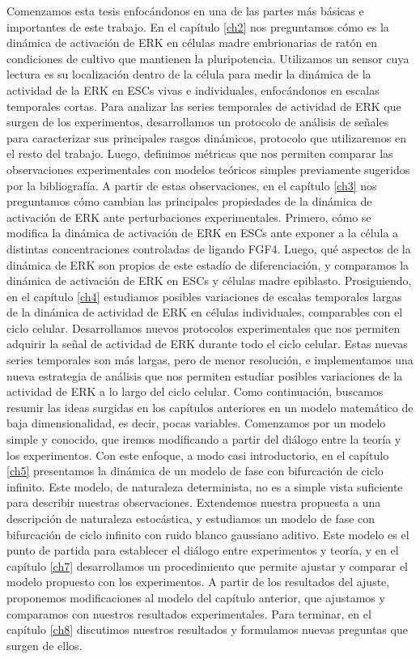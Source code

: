 \documentclass[./main.tex]{subfiles}
\begin{document}
 

Comenzamos esta tesis enfocándonos en una de las partes más básicas e importantes de este trabajo. En el capítulo \ref{ch2} nos preguntamos cómo es la dinámica de activación de ERK en células madre embrionarias de ratón en condiciones de cultivo que mantienen la pluripotencia. Utilizamos un sensor cuya lectura es su localización dentro de la célula para medir la dinámica de la actividad de la ERK en ESCs vivas e individuales, enfocándonos en escalas temporales cortas. Para analizar las series temporales de actividad de ERK que surgen de los experimentos, desarrollamos un protocolo de análisis de señales para caracterizar sus principales rasgos dinámicos, protocolo que utilizaremos en el resto del trabajo. Luego, definimos métricas que nos permiten comparar las observaciones experimentales con modelos teóricos simples previamente sugeridos por la bibliografía. A partir de estas observaciones, en el capítulo \ref{ch3} nos preguntamos cómo cambian las principales propiedades de la dinámica de activación de ERK ante perturbaciones experimentales. Primero, cómo se modifica la dinámica de activación de ERK en ESCs ante exponer a la célula a distintas concentraciones controladas de ligando FGF4. Luego, qué aspectos de la dinámica de ERK son propios de este estadío de diferenciación, y comparamos la dinámica de activación de ERK en ESCs y células madre epiblasto. Prosiguiendo, en el capítulo \ref{ch4} estudiamos posibles variaciones de escalas temporales largas de la dinámica de actividad de ERK en células individuales, comparables con el ciclo celular. Desarrollamos nuevos protocolos experimentales que nos permiten adquirir la señal de actividad de ERK durante todo el ciclo celular. Estas nuevas series temporales son más largas, pero de menor resolución, e implementamos una nueva estrategia de análisis que nos permiten estudiar posibles variaciones de la actividad de ERK a lo largo del ciclo celular. Como continuación, buscamos resumir las ideas surgidas en los capítulos anteriores en un modelo matemático de baja dimensionalidad, es decir, pocas variables. Comenzamos por un modelo simple y conocido, que iremos modificando a partir del diálogo entre la teoría y los experimentos. Con este enfoque, a modo casi introductorio, en el capítulo \ref{ch5} presentamos la dinámica de un modelo de fase con bifurcación de ciclo infinito. Este modelo, de naturaleza determinista, no es a simple vista suficiente para describir nuestras observaciones. Extendemos nuestra propuesta a una descripción de naturaleza estocástica, y estudiamos un modelo de fase con bifurcación de ciclo infinito con ruido blanco gaussiano aditivo. Este modelo es el punto de partida para establecer el diálogo entre experimentos y teoría, y en el capítulo \ref{ch7} desarrollamos un procedimiento que permite ajustar y comparar el modelo propuesto con los experimentos. A partir de los resultados del ajuste, proponemos modificaciones al modelo del capítulo anterior, que ajustamos y comparamos con nuestros resultados experimentales. Para terminar, en el capítulo \ref{ch8} discutimos nuestros resultados y formulamos nuevas preguntas que surgen de ellos.
\end{document}
